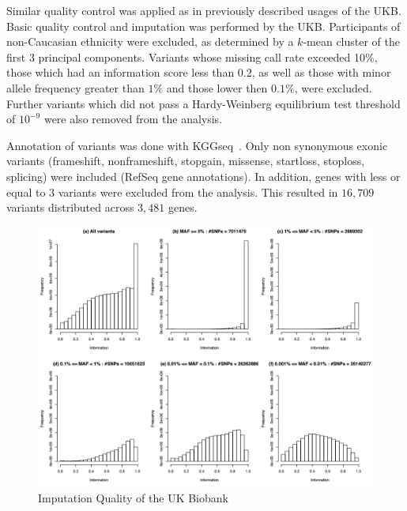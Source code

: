 Similar quality control was applied as in previously described usages of the UKB\@.
Basic quality control and imputation was performed by the UKB\@.
Participants of non-Caucasian ethnicity were excluded, as determined by a $k$-mean cluster of the first 3 principal components.
Variants whose missing call rate  exceeded 10\%, those which had an information score less than $0.2$, as well as those with minor allele frequency greater than $1\%$ and those lower then $0.1\%$, were excluded.
Further variants which did not pass a Hardy-Weinberg equilibrium test threshold of $10^{-9}$ were also removed from the analysis.

Annotation of variants was done with KGGseq~\cite{Li2012b}.
Only non synonymous exonic variants (frameshift, nonframeshift, stopgain, missense, startloss, stoploss, splicing) were included (RefSeq gene annotations).
In addition, genes with less or equal to $3$ variants were excluded from the analysis.
This resulted in $16,709$ variants distributed across $3,481$ genes.

\begin{figure}[htpb]
  \centering
  \includegraphics[width=0.8\linewidth]{ksburden/figures/imputation_qc.png}
  \caption[Imputation Quality]{Imputation Quality of the UK Biobank~\cite{Marchini2015}}\label{fig:imputation}
\end{figure}
